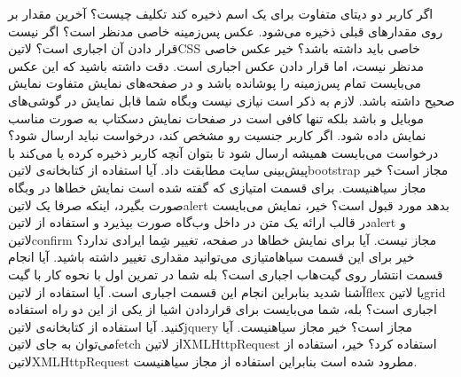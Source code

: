  اگر کاربر دو دیتای متفاوت برای یک اسم ذخیره کند تکلیف چیست؟
 آخرین مقدار بر روی مقدارهای قبلی ذخیره می‌شود.
 عکس پس‌زمینه خاصی مدنظر است؟ اگر نیست قرار دادن آن اجباری است؟ ‌لاتین{CSS} خاصی باید داشته باشد؟
 خیر عکس خاصی مدنظر نیست، اما قرار دادن عکس اجباری است. دقت داشته باشید که این عکس می‌بایست تمام پس‌زمینه را پوشانده باشد و در صفحه‌های نمایش متفاوت نمایش صحیح داشته باشد. لازم به ذکر است نیازی نیست وبگاه شما قابل نمایش در گوشی‌های موبایل و  باشد بلکه تنها کافی است در صفحات نمایش دسکتاپ به صورت مناسب نمایش داده شود.
 اگر کاربر جنسیت رو مشخص کند، درخواست نباید ارسال شود؟
 درخواست می‌بایست همیشه ارسال شود تا بتوان آنچه کاربر ذخیره کرده یا می‌کند با پیش‌بینی سایت مطابقت داد.
 آیا استفاده از کتابخانه‌ی ‌لاتین{bootstrap} مجاز است؟
 خیر مجاز ‌سیاه{نیست}.
 برای قسمت امتیازی که گفته شده است نمایش خطاها در وبگاه صورت بگیرد، اینکه صرفا یک ‌لاتین{alert} بدهد مورد قبول است؟
 خیر، نمایش می‌بایست در قالب ارائه یک متن در داخل وب‌گاه صورت بپذیرد و استفاده از ‌لاتین{alert} و ‌لاتین{confirm} مجاز نیست.
 آیا برای نمایش خطاها در صفحه، تغییر شِما ایرادی ندارد؟
 خیر برای این قسمت ‌سیاه{امتیازی} می‌توانید مقداری تغییر داشته باشید.
 آیا انجام قسمت انتشار روی گیت‌هاب اجباری است؟
 بله شما در تمرین اول با نحوه کار با گیت آشنا شدید بنابراین انجام این قسمت اجباری است.
 آیا استفاده از ‌لاتین{flex} یا ‌لاتین{grid} اجباری است؟
 بله، شما می‌بایست برای قراردادن اشیا از یکی از این دو راه استفاده کنید.
 آیا استفاده از کتابخانه‌ی ‌لاتین{jquery} مجاز است؟
 خیر مجاز ‌سیاه{نیست}.
 آیا می‌توان به جای ‌لاتین{fetch} از ‌لاتین{XMLHttpRequest} استفاده کرد؟
 خیر، استفاده از ‌لاتین{XMLHttpRequest} مطرود شده است بنابراین استفاده از مجاز ‌سیاه{نیست}.
